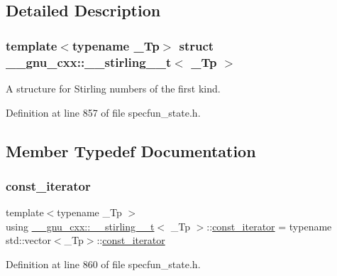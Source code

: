 \subsection{Detailed Description}
\subsubsection*{template$<$typename \+\_\+\+Tp$>$\newline
struct \+\_\+\+\_\+gnu\+\_\+cxx\+::\+\_\+\+\_\+stirling\+\_\+\_\+t$<$ \+\_\+\+Tp $>$}

A structure for Stirling numbers of the first kind. 

Definition at line 857 of file specfun\+\_\+state.\+h.



\subsection{Member Typedef Documentation}
\mbox{\label{struct____gnu__cxx_1_1____stirling__2__t_a1de3af89467d37bd2d1f1228186c08e8}} 
\subsubsection{\texorpdfstring{const\+\_\+iterator}{const\_iterator}}
{\footnotesize\ttfamily template$<$typename \+\_\+\+Tp $>$ \\
using \hyperlink{struct____gnu__cxx_1_1____stirling__2__t}{\+\_\+\+\_\+gnu\+\_\+cxx\+::\+\_\+\+\_\+stirling\+\_\+\_\+t}$<$ \+\_\+\+Tp $>$\+::\hyperlink{struct____gnu__cxx_1_1____stirling__2__t_a1de3af89467d37bd2d1f1228186c08e8}{const\+\_\+iterator} =  typename std\+::vector$<$\+\_\+\+Tp$>$\+::\hyperlink{struct____gnu__cxx_1_1____stirling__2__t_a1de3af89467d37bd2d1f1228186c08e8}{const\+\_\+iterator}}



Definition at line 860 of file specfun\+\_\+state.\+h.

\mbox{\label{struct____gnu__cxx_1_1____stirling__2__t_aa7fda155fac4d993df6fc7deb4a66e84}} 
